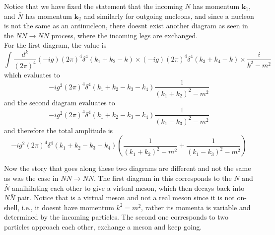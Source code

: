 \documentclass[11pt, notitlepage]{report}
\numberwithin{equation}{section}
\begin{document}
    Notice that we have fixed the statement that the incoming \(N\) has momentum \(\textbf{k}_1\), and \(\bar N\) has momentum \(\textbf{k}_2\) and similarly for outgoing nucleons, and since a nucleon is not the same as an antinucleon, there doesnt exist another diagram as seen in the \(NN\to NN\) process, where the incoming legs are exchanged.\\

    For the first diagram, the value is 
    \begin{equation*}
        \int \frac{d^k}{(2\pi)^4}(-ig)(2\pi)^4\delta^4(k_1 + k_2 - k)\times(-ig)(2\pi)^4\delta^4(k_3 + k_4 - k)\times \frac{i}{k^2 - m^2} 
    \end{equation*}
    which evaluates to 
    \begin{equation*}
        -ig^2(2\pi)^4\delta^4(k_1 + k_2 - k_3 - k_4)\frac{1}{(k_1 + k_2)^2 - m^2 } 
    \end{equation*}
    and the second diagram evaluates to 
    \begin{equation*}
        -ig^2(2\pi)^4\delta^4(k_1 + k_2 - k_3 - k_4)\frac{1}{(k_1 
    - k_3)^2 - m^2} 
    \end{equation*}
    and therefore the total amplitude is 
    \begin{equation*}
        -ig^2(2\pi)^4\delta^4(k_1 + k_2 - k_3 - k_4) \left(  \frac{1}{(k_1 + k_2)^2 - m^2} +    \frac{1}{(k_1 
    - k_3)^2 - m^2}    \right)
    \end{equation*}

    Now the story that goes along these two diagrams are different and not the same as was the case in \(NN\to NN\). The first diagram in this corresponds to the \(N\) and \(\bar{N}\) annihilating each other to give a virtual meson, which then decays back into \(N\bar{N}\) pair. Notice that is a virtual meson and not a real meson since it is not on-shell, i.e., it doesnt have momentum \(k^2 = m^2\), rather its momenta is variable and determined by the incoming particles. The second one corresponds to two particles approach each other, exchange a meson and keep going. 
    
\end{document}
